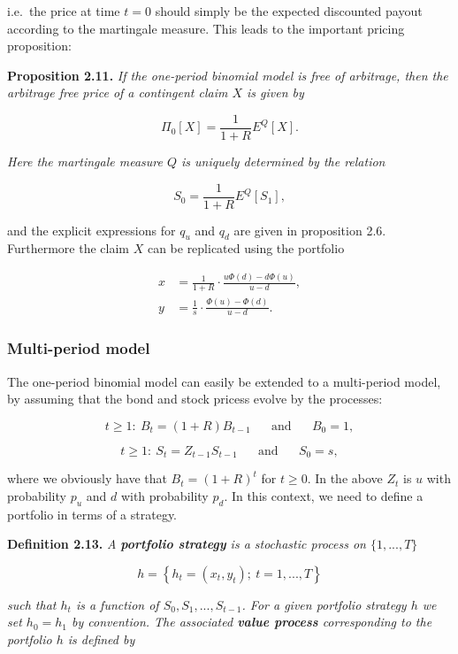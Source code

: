 \documentclass[
]{article}
\begin{document}
i.e.~the price at time \(t=0\) should simply be the expected discounted
payout according to the martingale measure. This leads to the important
pricing proposition:

\textbf{Proposition 2.11.} \emph{If the one-period binomial model is
free of arbitrage, then the arbitrage free price of a contingent claim
\(X\) is given by}

\[
\Pi_0[X]=\frac{1}{1+R}E^Q[X].\tag{2.4}
\]

\emph{Here the martingale measure \(Q\) is uniquely determined by the
relation}

\[
S_0=\frac{1}{1+R}E^Q[S_1],\tag{2.5}
\]

and the explicit expressions for \(q_u\) and \(q_d\) are given in
proposition 2.6. Furthermore the claim \(X\) can be replicated using the
portfolio

\begin{align*}
x&=\frac{1}{1+R}\cdot\frac{u\Phi(d)-d\Phi(u)}{u-d},\tag{2.6}\\
y&=\frac{1}{s}\cdot\frac{\Phi(u)-\Phi(d)}{u-d}.\tag{2.7}
\end{align*}

\hypertarget{multi-period-model}{%
\subsubsection{Multi-period model}\label{multi-period-model}}

The one-period binomial model can easily be extended to a multi-period
model, by assuming that the bond and stock pricess evolve by the
processes:

\[
t\ge1:\ B_t=(1+R)B_{t-1}\hspace{20pt}\text{and}\hspace{20pt}B_0=1,
\]

\[
t\ge1:\ S_t=Z_{t-1}S_{t-1}\hspace{20pt}\text{and}\hspace{20pt}S_0=s,
\]

where we obviously have that \(B_t=(1+R)^t\) for \(t\ge 0\). In the
above \(Z_t\) is \(u\) with probability \(p_u\) and \(d\) with
probability \(p_d\). In this context, we need to define a portfolio in
terms of a strategy.

\textbf{Definition 2.13.} \emph{A \textbf{portfolio strategy} is a
stochastic process on \(\{1,...,T\}\)}

\[
h=\left\{h_t=(x_t,y_t);\ t=1,...,T\right\}
\]

\emph{such that \(h_t\) is a function of \(S_0,S_1,...,S_{t-1}\). For a
given portfolio strategy \(h\) we set \(h_0=h_1\) by convention. The
associated \textbf{value process} corresponding to the portfolio \(h\)
is defined by}
\end{document}
